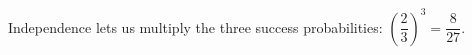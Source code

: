 Independence lets us multiply the three success probabilities: $(\dfrac{2}{3})^3=\boxed{\dfrac{8}{27}}$.
